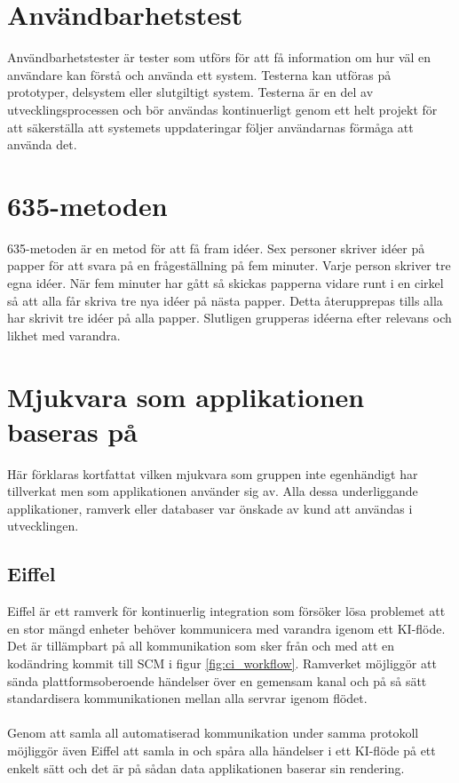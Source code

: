 \section{Användbarhetstest}
\label{sec:usability-tests}
Användbarhetstester är tester som utförs för att få information om hur väl en användare kan förstå och använda ett system. Testerna kan utföras på prototyper, delsystem eller slutgiltigt system. Testerna är en del av utvecklingsprocessen och bör användas kontinuerligt genom ett helt projekt för att
säkerställa att systemets uppdateringar följer användarnas förmåga att använda det.\cite{effective-prototyping}

\section{635-metoden}
635-metoden är en metod för att få fram idéer. Sex personer skriver idéer på papper för att svara på en frågeställning på fem minuter. Varje person skriver tre egna idéer. När fem minuter har gått så skickas papperna vidare runt i en cirkel så att alla får skriva tre nya idéer på nästa papper. Detta återupprepas tills alla har skrivit tre idéer på alla papper. Slutligen grupperas idéerna efter relevans och likhet med varandra. \cite{arvolaboken}

\section{Mjukvara som applikationen baseras på}
\label{sec:software-base}
Här förklaras kortfattat vilken mjukvara som gruppen inte egenhändigt har tillverkat men som applikationen använder sig av. Alla dessa underliggande applikationer, ramverk eller databaser var önskade av kund att användas i utvecklingen.

\subsection{Eiffel}
\label{sec:eiffel}
Eiffel är ett ramverk för kontinuerlig integration som försöker lösa problemet att en stor
mängd enheter behöver kommunicera med varandra igenom ett KI-flöde. Det är tillämpbart på all
kommunikation som sker från och med att en kodändring kommit till SCM i figur \ref{fig:ci_workflow}.
Ramverket möjliggör att sända plattformsoberoende händelser över en gemensam kanal
och på så sätt standardisera kommunikationen mellan alla servrar igenom flödet.\cite{website:eiffel}
\\ \\
Genom att samla all automatiserad kommunikation under samma protokoll möjliggör även Eiffel att samla in och spåra alla händelser i ett KI-flöde på ett enkelt sätt och det är på sådan data applikationen baserar sin rendering.


